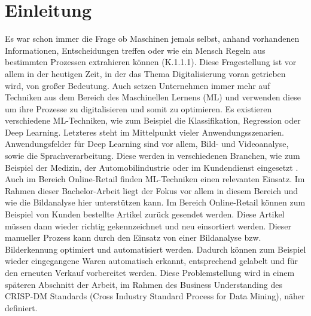 \documentclass[12pt]{scrreprt}
\begin{document}
	
\begin{titlepage}
	

	
\end{titlepage}	

\newpage
\tableofcontents
\newpage

\listoffigures
{}
\newpage

\listoftables
{}
\newpage

\chapter{Einleitung}
Es war schon immer die Frage ob Maschinen jemals selbst, anhand vorhandenen Informationen, Entscheidungen treffen oder wie ein Mensch Regeln aus bestimmten Prozessen extrahieren können \cite{Chollet2018}(K.1.1.1). Diese Fragestellung ist vor allem in der heutigen Zeit, in der das Thema Digitalisierung voran getrieben wird, von großer Bedeutung. Auch setzen Unternehmen immer mehr auf Techniken aus dem Bereich des Maschinellen Lernens (ML) und verwenden diese um ihre Prozesse zu digitalisieren und somit zu optimieren. Es existieren verschiedene ML-Techniken, wie zum Beispiel die Klassifikation, Regression oder Deep Learning. Letzteres steht im Mittelpunkt vieler Anwendungsszenarien. Anwendungsfelder für Deep Learning sind vor allem, Bild- und Videoanalyse, sowie die Sprachverarbeitung. Diese werden in verschiedenen Branchen, wie zum Beispiel der Medizin, der Automobilindustrie oder im Kundendienst eingesetzt \cite{FraunhoferGesellschaft2018}. Auch im Bereich Online-Retail finden ML-Techniken einen relevanten Einsatz. Im Rahmen dieser Bachelor-Arbeit liegt der Fokus vor allem in diesem Bereich und wie die Bildanalyse hier unterstützen kann. Im Bereich Online-Retail können zum Beispiel von Kunden bestellte Artikel zurück gesendet werden. Diese Artikel müssen dann wieder richtig gekennzeichnet und neu einsortiert werden. Dieser manueller Prozess kann durch den Einsatz von einer Bildanalyse bzw. Bilderkennung optimiert und automatisiert werden. Dadurch können zum Beispiel wieder eingegangene Waren automatisch erkannt, entsprechend gelabelt und für den erneuten Verkauf vorbereitet werden. Diese Problemstellung wird in einem späteren Abschnitt der Arbeit, im Rahmen des Business Understanding des CRISP-DM Standards (Cross Industry Standard Process for Data Mining), näher definiert.\\
\end{document}
